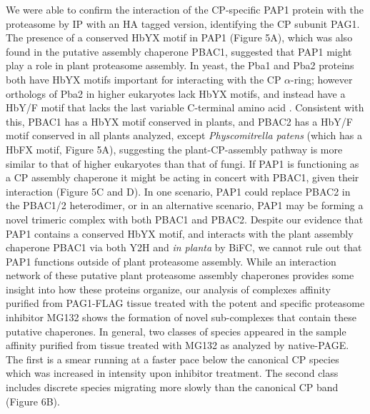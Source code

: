 We were able to confirm the interaction of the CP-specific PAP1 protein with the proteasome by IP with an HA tagged version, identifying the CP subunit PAG1. The presence of a conserved HbYX motif in PAP1 (Figure 5A), which was also found in the putative assembly chaperone PBAC1, suggested that PAP1 might play a role in plant proteasome assembly. In yeast, the Pba1 and Pba2 proteins both have HbYX motifs important for interacting with the CP $\alpha$-ring; however orthologs of Pba2 in higher eukaryotes lack HbYX motifs, and instead have a HbY/F motif that lacks the last variable C-terminal amino  acid \citep{kusmierczyk11}. Consistent with this, PBAC1 has a HbYX motif conserved in plants, and PBAC2 has a HbY/F motif conserved in all plants analyzed, except \textit{Physcomitrella patens} (which has a HbFX motif, Figure 5A), suggesting the plant-CP-assembly pathway is more similar to that of higher eukaryotes than that of fungi. If PAP1 is functioning as a CP assembly chaperone it might be acting in concert with PBAC1, given their interaction (Figure 5C and D). In one scenario, PAP1 could replace PBAC2 in the PBAC1/2 heterodimer, or in an alternative scenario, PAP1 may be forming a novel trimeric complex with both PBAC1 and PBAC2. Despite our evidence that PAP1 contains a conserved HbYX motif, and interacts with the plant assembly chaperone PBAC1 via both Y2H and \textit{in planta} by BiFC, we cannot rule out that PAP1 functions outside of plant proteasome assembly.
While an interaction network of these putative plant proteasome assembly chaperones provides some insight into how these proteins organize, our analysis of complexes affinity purified from PAG1-FLAG tissue treated with the potent and specific proteasome inhibitor MG132 shows the formation of novel sub-complexes that contain these putative chaperones. In general, two classes of species appeared in the sample affinity purified from tissue treated with MG132 as analyzed by native-PAGE. The first is a smear running at a faster pace below the canonical CP species which was increased in intensity upon inhibitor treatment. The second class includes discrete species migrating more slowly than the canonical CP band (Figure 6B). 
